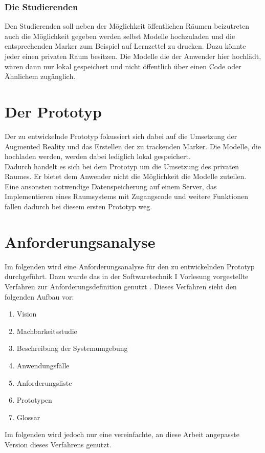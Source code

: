 \subsubsection{Die Studierenden}\label{sec:Anwendungsfall:Studierender}
Den Studierenden soll neben der Möglichkeit öffentlichen Räumen beizutreten auch die Möglichkeit gegeben werden selbst Modelle hochzuladen und die entsprechenden Marker zum Beispiel auf Lernzettel zu drucken. Dazu könnte jeder einen privaten Raum besitzen. Die Modelle die der Anwender hier hochlädt, wären dann nur lokal gespeichert und nicht öffentlich über einen Code oder Ähnlichem zugänglich. 

\section{Der Prototyp}
Der zu entwickelnde Prototyp fokussiert sich dabei auf die Umsetzung der Augmented Reality und das Erstellen der zu trackenden Marker. Die Modelle, die hochladen werden, werden dabei lediglich lokal gespeichert. \\
Dadurch handelt es sich bei dem Prototyp um die Umsetzung des \glqq privaten Raumes\grqq . Er bietet dem Anwender nicht die Möglichkeit die Modelle zuteilen.\\ 
Eine ansonsten notwendige Datenspeicherung auf einem Server, das Implementieren eines Raumsystems mit Zugangscode und weitere Funktionen fallen dadurch bei diesem ersten Prototyp weg.


\section{Anforderungsanalyse}\label{sec:Anforderungsanalyse}
Im folgenden wird eine Anforderungsanalyse für den zu entwickelnden Prototyp durchgeführt.
Dazu wurde das in der Softwaretechnik I Vorlesung vorgestellte Verfahren zur Anforderungsdefinition genutzt \citep[Folie 209-214]{winter:srs-anforderungen}. 
Dieses Verfahren sieht den folgenden Aufbau vor:
\begin{enumerate}
\item Vision 
\item Machbarkeitsstudie
\item Beschreibung der Systemumgebung
\item Anwendungsfälle
\item Anforderungsliste
\item Prototypen
\item Glossar
\end{enumerate}
Im folgenden wird jedoch nur eine vereinfachte, an diese Arbeit angepasste Version dieses Verfahrens genutzt.

